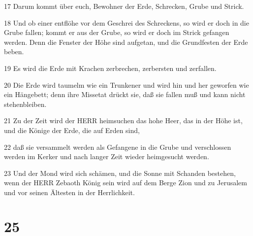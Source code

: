 \par 17 Darum kommt über euch, Bewohner der Erde, Schrecken, Grube und Strick.
\par 18 Und ob einer entflöhe vor dem Geschrei des Schreckens, so wird er doch in die Grube fallen; kommt er aus der Grube, so wird er doch im Strick gefangen werden. Denn die Fenster der Höhe sind aufgetan, und die Grundfesten der Erde beben.
\par 19 Es wird die Erde mit Krachen zerbrechen, zerbersten und zerfallen.
\par 20 Die Erde wird taumelm wie ein Trunkener und wird hin und her geworfen wie ein Hängebett; denn ihre Missetat drückt sie, daß sie fallen muß und kann nicht stehenbleiben.
\par 21 Zu der Zeit wird der HERR heimsuchen das hohe Heer, das in der Höhe ist, und die Könige der Erde, die auf Erden sind,
\par 22 daß sie versammelt werden als Gefangene in die Grube und verschlossen werden im Kerker und nach langer Zeit wieder heimgesucht werden.
\par 23 Und der Mond wird sich schämen, und die Sonne mit Schanden bestehen, wenn der HERR Zebaoth König sein wird auf dem Berge Zion und zu Jerusalem und vor seinen Ältesten in der Herrlichkeit.

\chapter{25}

